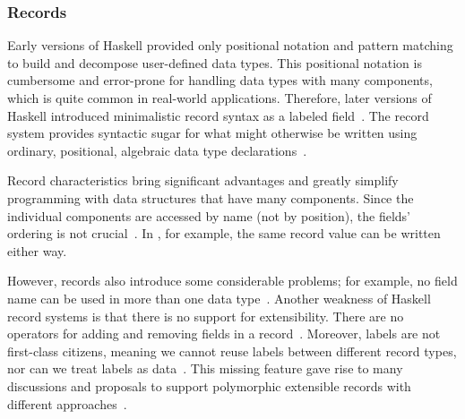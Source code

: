 \begin{frame}\frametitle{Records}
    
    Early versions of Haskell provided only positional notation and pattern matching to build and decompose user-defined data types. This positional notation is cumbersome and error-prone for handling data types with many components, which is quite common in real-world applications. Therefore, later versions of Haskell introduced minimalistic record syntax as a labeled field~\cite{lw-ext-records, history-of-haskell}.
The record system provides syntactic sugar for what might otherwise be written using ordinary, positional, algebraic data type declarations~\cite{lw-ext-records}. 



Record characteristics bring significant advantages and greatly simplify programming with data structures that have many components. Since the individual components are accessed by name (not by position), the fields' ordering is not crucial~\cite{lw-ext-records}.
In , for example, 
the same record value can be written either way.

However, records also introduce some considerable problems; for example, 
no field name can be used in more than one data type~\cite{lw-ext-records}.
Another weakness of Haskell record systems is that there is no support for extensibility. 
There are no operators for adding and removing fields in a record~\cite{poly-ext-records, hlist}. 
Moreover, labels are not first-class citizens, 
meaning we cannot reuse labels between different record types, 
nor can we treat labels as data~\cite{hlist}.
This missing feature gave rise to many discussions and proposals to support polymorphic extensible records with different approaches~\cite{history-of-haskell, poly-ext-records, hlist, basic-tlp}.

\end{frame}


